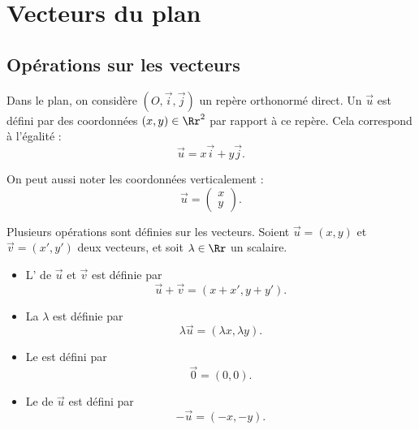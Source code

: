 \documentclass[11pt,class=report,crop=false]{standalone}
\begin{document}
\newcommand{\myparallel}{/\!\!/}


%
%



\section{Vecteurs du plan}


\subsection{Opérations sur les vecteurs}

Dans le plan, on considère $(O, \vec i, \vec j)$ un repère orthonormé direct.
Un  $\vec u$ est défini par des coordonnées $(x, y) \in \Rr^2$ par rapport à ce repère.
Cela correspond à l'égalité :
$$
    \vec u = x \vec i + y \vec j.
$$


On peut aussi noter les coordonnées verticalement :
$$
    \vec u = \begin{pmatrix} x \\ y \end{pmatrix}.
$$


Plusieurs opérations sont définies sur les vecteurs.
Soient $\vec u = (x,y)$ et $\vec v = (x',y')$ deux vecteurs, et soit $\lambda \in \Rr$ un scalaire.
\begin{itemize}
    \item L' de $\vec u$ et $\vec v$ est définie par
        \[ \vec u + \vec v = (x+x', y+y'). \]
    \item La  $\lambda$ est définie par
        \[ \lambda \vec u = (\lambda x, \lambda y). \]
    \item Le  est défini par
        \[ \vec 0 = (0,0). \]
    \item Le  de $\vec u$ est défini par
        \[ -\vec u = (-x,-y). \]
\end{itemize}
\end{document}
